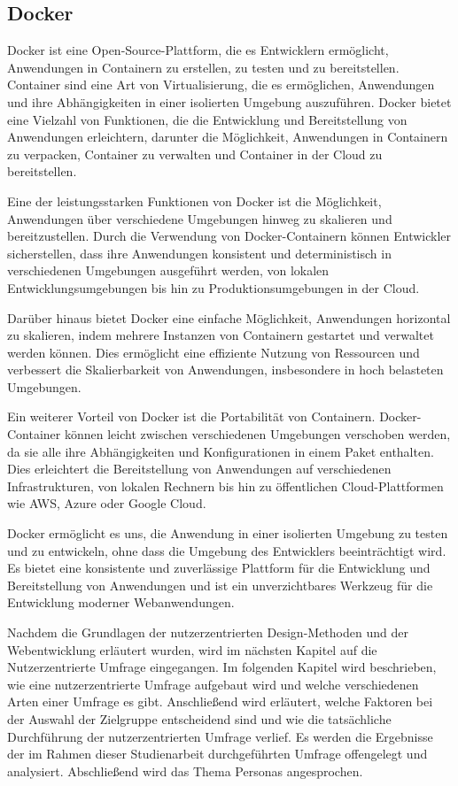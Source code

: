 \subsection{Docker}

Docker ist eine Open-Source-Plattform, die es Entwicklern ermöglicht, Anwendungen in Containern zu erstellen, zu testen und zu bereitstellen. Container sind eine Art von Virtualisierung, die es ermöglichen, Anwendungen und ihre Abhängigkeiten in einer isolierten Umgebung auszuführen. Docker bietet eine Vielzahl von Funktionen, die die Entwicklung und Bereitstellung von Anwendungen erleichtern, darunter die Möglichkeit, Anwendungen in Containern zu verpacken, Container zu verwalten und Container in der Cloud zu bereitstellen.

Eine der leistungsstarken Funktionen von Docker ist die Möglichkeit, Anwendungen über verschiedene Umgebungen hinweg zu skalieren und bereitzustellen. Durch die Verwendung von Docker-Containern können Entwickler sicherstellen, dass ihre Anwendungen konsistent und deterministisch in verschiedenen Umgebungen ausgeführt werden, von lokalen Entwicklungsumgebungen bis hin zu Produktionsumgebungen in der Cloud.

Darüber hinaus bietet Docker eine einfache Möglichkeit, Anwendungen horizontal zu skalieren, indem mehrere Instanzen von Containern gestartet und verwaltet werden können. Dies ermöglicht eine effiziente Nutzung von Ressourcen und verbessert die Skalierbarkeit von Anwendungen, insbesondere in hoch belasteten Umgebungen.

Ein weiterer Vorteil von Docker ist die Portabilität von Containern. Docker-Container können leicht zwischen verschiedenen Umgebungen verschoben werden, da sie alle ihre Abhängigkeiten und Konfigurationen in einem Paket enthalten. Dies erleichtert die Bereitstellung von Anwendungen auf verschiedenen Infrastrukturen, von lokalen Rechnern bis hin zu öffentlichen Cloud-Plattformen wie AWS, Azure oder Google Cloud.

Docker ermöglicht es uns, die Anwendung in einer isolierten Umgebung zu testen und zu entwickeln, ohne dass die Umgebung des Entwicklers beeinträchtigt wird. Es bietet eine konsistente und zuverlässige Plattform für die Entwicklung und Bereitstellung von Anwendungen und ist ein unverzichtbares Werkzeug für die Entwicklung moderner Webanwendungen. \cite{docker}


Nachdem die Grundlagen der nutzerzentrierten Design-Methoden und der Webentwicklung erläutert wurden, wird im nächsten Kapitel auf die Nutzerzentrierte Umfrage eingegangen. Im folgenden Kapitel wird beschrieben, wie eine nutzerzentrierte Umfrage aufgebaut wird und welche verschiedenen Arten einer Umfrage es gibt. Anschließend wird erläutert, welche Faktoren bei der Auswahl der Zielgruppe entscheidend sind und wie die tatsächliche Durchführung der nutzerzentrierten Umfrage verlief. Es werden die Ergebnisse der im Rahmen dieser Studienarbeit durchgeführten Umfrage offengelegt und analysiert. Abschließend wird das Thema Personas angesprochen.
